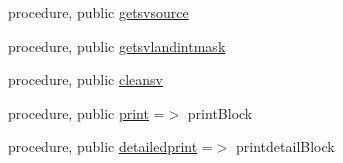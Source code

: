 \begin{DoxyCompactItemize}
\item 
procedure, public \mbox{\hyperlink{structblocks__mod_1_1block__class_aa94c1e7e359c2b943c711d85d4edee3c}{getsvsource}}
\item 
procedure, public \mbox{\hyperlink{structblocks__mod_1_1block__class_a953609bdf877e35ff4776a4f753d35c3}{getsvlandintmask}}
\item 
procedure, public \mbox{\hyperlink{structblocks__mod_1_1block__class_a17439a0d58c047428bee213d2a7b4bd5}{cleansv}}
\item 
procedure, public \mbox{\hyperlink{structblocks__mod_1_1block__class_a43b4c133934eaadb55d30cf834d1e28c}{print}} =$>$ print\+Block
\item 
procedure, public \mbox{\hyperlink{structblocks__mod_1_1block__class_a937d8dca8393460bc718dafa8a5c03ac}{detailedprint}} =$>$ printdetail\+Block
\end{DoxyCompactItemize}
